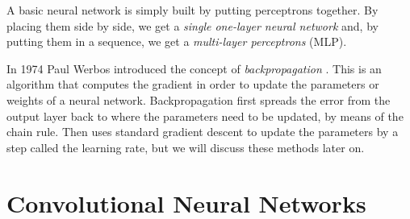 \documentclass[12pt,a4paper]{report}
\theoremstyle{definition}
\begin{document}
A basic neural network is simply built by putting perceptrons together. By placing them side by side, we get a \emph{single one-layer neural network} and, by putting them in a sequence, we get a \emph{multi-layer perceptrons} (MLP)\cite{MLP}.

In 1974 Paul Werbos introduced the concept of \emph{backpropagation} \cite{Back_werbos}. This is an algorithm that computes the gradient in order to update the parameters or weights of a neural network. Backpropagation first spreads the error from the output layer back to where the parameters need to be updated, by means of the chain rule. Then uses standard gradient descent to update the parameters by a step called the learning rate, but we will discuss these methods later on.

\section{Convolutional Neural Networks}
\label{sec:CNN}
\end{document}
